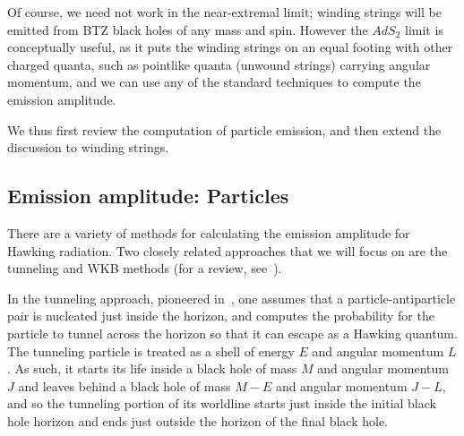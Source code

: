 \documentclass[11pt]{article}
\newcommand{\rcite}{\cite}
\numberwithin{equation}{section}
\begin{document}
Of course, we need not work in the near-extremal limit; winding strings will be emitted from BTZ black holes of any mass and spin.  However the $AdS_2$ limit is conceptually useful, as it puts the winding strings on an equal footing with other charged quanta, such as pointlike quanta (unwound strings) carrying angular momentum, and we can use any of the standard techniques to compute the emission amplitude.

We thus first review the computation of particle emission, and then extend the discussion to winding strings.



\subsection{Emission amplitude: Particles}
\label{sec:pamplitude}

There are a variety of methods for calculating the emission amplitude for Hawking radiation.  Two closely related approaches that we will focus on are the tunneling and WKB methods (for a review, see~\rcite{Vanzo:2011wq}).  

In the tunneling approach, pioneered in~\rcite{Kraus:1994by,Kraus:1994fj,Parikh:1999mf}, one assumes that a particle-antiparticle pair is nucleated just inside the horizon, and computes the probability for the particle to tunnel across the horizon so that it can escape as a Hawking quantum.  The tunneling particle is treated as a shell of energy $E $ and angular momentum $L $.  As such, it starts its life inside a black hole of mass $M$ and angular momentum $J$ and leaves behind a black hole of mass $M-E $ and angular momentum $J-L$, and so the tunneling portion of its worldline starts just inside the initial black hole horizon and ends just outside the horizon of the final black hole.  
\end{document}
